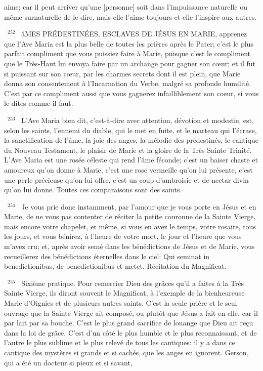 \documentclass[paper=a5,pagesize=pdftex,fontsize=15pt,headinclude=on,twoside=off]{scrbook}
\newcommand{\negphantom}[1]{\settowidth{\dimen0}{#1}\hspace*{-\dimen0}}
\newcommand{\versenb}[1]{\par \vspace{10pt}~\negphantom{~${}^{#1}$~}${}^{#1}$~}
\begin{document}
aime; car il peut arriver qu'une [personne] soit dans l'impuissance naturelle ou même surnaturelle de le dire, mais
elle l'aime toujours et elle l'inspire aux autres.
\versenb{252} âMES PRÉDESTINÉES, ESCLAVES DE JÉSUS EN MARIE, apprenez que l'Ave Maria est la plus belle de
toutes les prières après le Pater; c'est le plus parfait compliment que vous puissiez faire à Marie, puisque c'est le
compliment que le Très-Haut lui envoya faire par un archange pour gagner son cœur; et il fut si puissant sur son
cœur, par les charmes secrets dont il est plein, que Marie donna son consentement à l'Incarnation du Verbe,
malgré sa profonde humilité. C'est par ce compliment aussi que vous gagnerez infailliblement son coeur, si vous le
dites comme il faut.
\versenb{253} L'Ave Maria bien dit, c'est-à-dire avec attention, dévotion et modestie, est, selon les saints, l'ennemi du
diable, qui le met en fuite, et le marteau qui l'écrase, la sanctification de l'âme, la joie des anges, la mélodie des
prédestinés, le cantique du Nouveau Testament, le plaisir de Marie et la gloire de la Très Sainte Trinité. L'Ave
Maria est une rosée céleste qui rend l'âme féconde; c'est un baiser chaste et amoureux qu'on donne à Marie, c'est
une rose vermeille qu'on lui présente, c'est une perle précieuse qu'on lui offre, c'est un coup d'ambroisie et de
nectar divin qu'on lui donne. Toutes ces comparaisons sont des saints.
\versenb{254} Je vous prie donc instamment, par l'amour que je vous porte en Jésus et en Marie, de ne vous pas contenter
de réciter la petite couronne de la Sainte Vierge, mais encore votre chapelet, et même, si vous en avez le temps,
votre rosaire, tous les jours, et vous bénirez, à l'heure de votre mort, le jour et l'heure que vous m'avez cru; et,
après avoir semé dans les bénédictions de Jésus et de Marie, vous recueillerez des bénédictions éternelles dans
le ciel: Qui seminat in benedictionibus, de benedictionibus et metet.
Récitation du Magnificat.
\versenb{255} Sixième pratique. Pour remercier Dieu des grâces qu'il a faites à la Très Sainte Vierge, ils diront souvent le
Magnificat, à l'exemple de la bienheureuse Marie d'Oignies et de plusieurs autres saints. C'est la seule prière et le
seul ouvrage que la Sainte Vierge ait composé, ou plutôt que Jésus a fait en elle, car il par lait par sa bouche.
C'est le plus grand sacrifice de louange que Dieu ait reçu dans la loi de grâce. C'est d'un côté le plus humble et le
plus reconnaissant, et de l'autre le plus sublime et le plus relevé de tous les cantiques: il y a dans ce cantique des
mystères si grands et si cachés, que les anges en ignorent. Gerson, qui a été un docteur si pieux et si savant,
\end{document}
